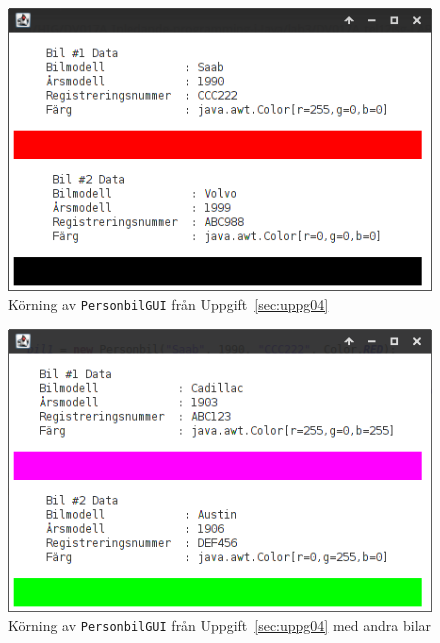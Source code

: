 \begin{figure}[htbp]
\centering
\includegraphics[width=0.75 \linewidth]{img/gui_1.png}
\caption{Körning av \texttt{PersonbilGUI} från Uppgift~\ref{sec:uppg04}}
\label{fig:uppg04-screenshot-gui1}
\end{figure}

\begin{figure}[htbp]
\centering
\includegraphics[width=0.75 \linewidth]{img/gui_2.png}
\caption{Körning av \texttt{PersonbilGUI} från Uppgift~\ref{sec:uppg04} med andra bilar}
\label{fig:uppg04-screenshot-gui2}
\end{figure}

